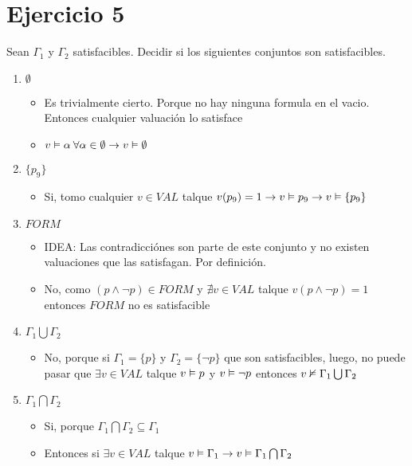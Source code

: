 \documentclass[14pt,a4paper,fleqn]{article}
\begin{document}
\section*{Ejercicio 5}
Sean $\Gamma_{1}$ y $\Gamma_{2}$ satisfacibles. Decidir si los siguientes conjuntos son satisfacibles.
\begin{enumerate}
	\item $\emptyset$
	\begin{itemize}
		\item Es trivialmente cierto. Porque no hay ninguna formula en el vacio. Entonces cualquier valuación lo satisface
		\item $v \vDash \alpha \: \forall \alpha \in \emptyset \rightarrow v \vDash \emptyset $
	\end{itemize}
	\item $\{p_{9}\}$
	\begin{itemize}
		\item Si, tomo cualquier $v \in VAL$ talque $v(p_{9})=1 \rightarrow v \vDash p_{9} \rightarrow v \vDash \{p_{9}\}$
	\end{itemize}
	\item $FORM$
	\begin{itemize}
		\item IDEA: Las contradicciónes son parte de este conjunto y no existen valuaciones que las satisfagan. Por definición.
		\item No, como $(p \wedge \neg p) \in FORM$ y $\nexists v \in VAL $ talque $v(p \wedge \neg p) = 1$ entonces $FORM$ no es satisfacible
	\end{itemize}
	\item $\Gamma_{1} \bigcup \Gamma_{2}$
	\begin{itemize}
		\item No, porque si $\Gamma_{1} = \{p\}$ y $\Gamma_{2} = \{\neg p \}$ que son satisfacibles, luego, no puede pasar que $\exists v \in VAL$ talque $v \vDash p$ y $v \vDash \neg p$ entonces $v \nvDash \Gamma_{1} \bigcup \Gamma_{2}$
	\end{itemize}
	\item $\Gamma_{1} \bigcap \Gamma_{2}$
	\begin{itemize}
		\item Si, porque $\Gamma_{1} \bigcap \Gamma_{2} \subseteq \Gamma_{1}$
		\item Entonces si $\exists v \in VAL$ talque $v \vDash \Gamma_{1} \rightarrow v \vDash \Gamma_{1} \bigcap \Gamma_{2}$
	\end{itemize}
\end{enumerate}
\end{document}
